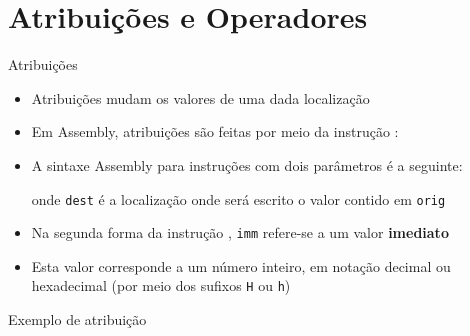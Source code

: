 \section{Atribuições e Operadores}

\begin{frame}[fragile]{Atribuições}

    \begin{itemize}
        \item Atribuições mudam os valores de uma dada localização

        \item Em Assembly, atribuições são feitas por meio da instrução :


        \item A sintaxe Assembly para instruções com dois parâmetros é a seguinte:
    

        onde \texttt{dest} é a localização onde será escrito o valor contido em \texttt{orig}

        \item Na segunda forma da instrução , \texttt{imm} refere-se a um valor
            \textbf{imediato}

        \item Esta valor corresponde a um número inteiro, em notação decimal ou hexadecimal (por
            meio dos sufixos \texttt{H} ou \texttt{h})

    \end{itemize}

\end{frame}

\begin{frame}[fragile]{Exemplo de atribuição}
\end{frame}

